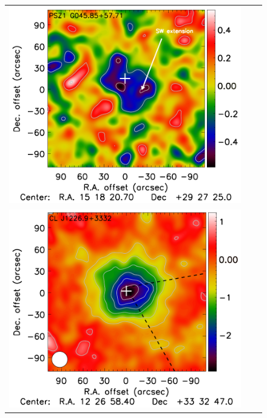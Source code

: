 \documentclass[twocolumn,traditabstract]{aa}
\begin{document}
\begin{figure}[p]
{\begin{tabular}{lll}
\includegraphics[trim=2.3cm 2.2cm 0cm 0cm, clip=true, scale=1]{Figure/DoG_PSZ1G045_15_15_45.pdf} \\
\includegraphics[trim=0cm 0.7cm 0cm 0cm, clip=true, scale=1]{Figure/Map_CLJ1227.pdf} & 

\end{tabular}}
\end{figure}
\end{document}
